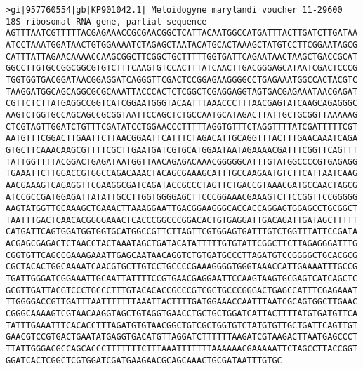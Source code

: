 \documentclass[11pt]{article}
\begin{document}
\begin{Verbatim}[commandchars=\\\{\}]
>gi|957760554|gb|KP901042.1| Meloidogyne marylandi voucher 11-29600 18S ribosomal RNA gene, partial sequence
AGTTTAATCGTTTTTACGAGAAACCGCGAACGGCTCATTACAATGGCCATGATTTACTTGATCTTGATAA
ATCCTAAATGGATAACTGTGGAAAATCTAGAGCTAATACATGCACTAAAGCTATGTCCTTCGGAATAGCG
CATTTATTAGAACAAAACCAAGCGGCTTCGGCTGCTTTTTGGTGATTCAGAATAACTAAGCTGACCGCAT
GGCCTTGTGCCGGCGGCGTGTCTTTCAAGTGTCCACTTTATCAACTTGACGGGAGCATAATCGACTCCCG
TGGTGGTGACGGATAACGGAGGATCAGGGTTCGACTCCGGAGAAGGGGCCTGAGAAATGGCCACTACGTC
TAAGGATGGCAGCAGGCGCGCAAATTACCCACTCTCGGCTCGAGGAGGTAGTGACGAGAAATAACGAGAT
CGTTCTCTTATGAGGCCGGTCATCGGAATGGGTACAATTTAAACCCTTTAACGAGTATCAAGCAGAGGGC
AAGTCTGGTGCCAGCAGCCGCGGTAATTCCAGCTCTGCCAATGCATAGACTTATTGCTGCGGTTAAAAAG
CTCGTAGTTGGATCTGTTTCGATATCCTGGAACCCTTTTTAGGTGTTTCTAGGTTTTATCGATTTTTCGT
AATGTTTCGGACTTGAATTCTTAACGGAATTCATTTCTAGACATTGCAGGTTTACTTTGAACAAATCAGA
GTGCTTCAAACAAGCGTTTTCGCTTGAATGATCGTGCATGGAATAATAGAAAACGATTTCGGTTCAGTTT
TATTGGTTTTACGGACTGAGATAATGGTTAACAGAGACAAACGGGGGCATTTGTATGGCCCCGTGAGAGG
TGAAATTCTTGGACCGTGGCCAGACAAACTACAGCGAAAGCATTTGCCAAGAATGTCTTCATTAATCAAG
AACGAAAGTCAGAGGTTCGAAGGCGATCAGATACCGCCCTAGTTCTGACCGTAAACGATGCCAACTAGCG
ATCCGCCGATGGAGATTATATTGCCTTGGTGGGGAGCTTCCCGGAAACGAAAGTCTTCCGGTTCCGGGGG
AAGTATGGTTGCAAAGCTGAAACTTAAAGGAATTGACGGAAGGGCACCACCAGGAGTGGAGCCTGCGGCT
TAATTTGACTCAACACGGGGAAACTCACCCGGCCCGGACACTGTGAGGATTGACAGATTGATAGCTTTTT
CATGATTCAGTGGATGGTGGTGCATGGCCGTTCTTAGTTCGTGGAGTGATTTGTCTGGTTTATTCCGATA
ACGAGCGAGACTCTAACCTACTAAATAGCTGATACATATTTTTGTGTATTCGGCTTCTTAGAGGGATTTG
CGGTGTTCAGCCGAAAGAAATTGAGCAATAACAGGTCTGTGATGCCCTTAGATGTCCGGGGCTGCACGCG
CGCTACACTGGCAAAATCAACGTGCTTGTCCTGCCCCGAAAGGGGTGGGTAAACCATTGAAAATTTGCCG
TGATTGGGATCGGAAATTGCAATTATTTTCCGTGAACGAGGAATTCCAAGTAAGTGCGAGTCATCAGCTC
GCGTTGATTACGTCCCTGCCCTTTGTACACACCGCCCGTCGCTGCCCGGGACTGAGCCATTTCGAGAAAT
TTGGGGACCGTTGATTTAATTTTTTTAAATTACTTTTGATGGAAACCAATTTAATCGCAGTGGCTTGAAC
CGGGCAAAAGTCGTAACAAGGTAGCTGTAGGTGAACCTGCTGCTGGATCATTACTTTTATGTGATGTTCA
TATTTGAAATTTCACACCTTTAGATGTGTAACGGCTGTCGCTGGTGTCTATGTGTTGCTGATTCAGTTGT
GAACGTCCGTGACTGAATATGAGGTGACATGTTAGGATCTTTTTTAAGATCGTAAGACTTAATGAGCCCT
TTATTGGGACGCCAGCACCCTTTTTTTCTTTAAATTTTTTTAAAAAACGAAAAATTCTAGCCTTACCGGT
GGATCACTCGGCTCGTGGATCGATGAAGAACGCAGCAAACTGCGATAATTTGTGC


\end{Verbatim}
\end{document}
